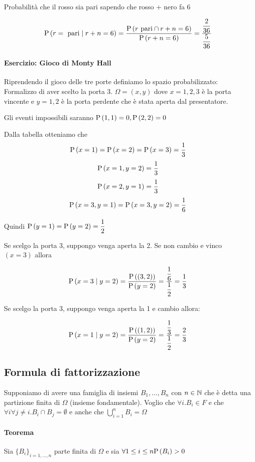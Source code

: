 Probabilità che il rosso sia pari sapendo che rosso + nero fa 6

\[ \text{P}\left(r = \text{ pari}  \mid  r+n = 6\right) = \dfrac{\text{P}\left(r \text{ pari} \cap r+n = 6\right)}{\text{P}\left(r+n = 6\right)} = \dfrac{\dfrac{2}{36}}{\dfrac{5}{36}} \]

\paragraph{Esercizio: Gioco di Monty Hall}
Riprendendo il gioco delle tre porte definiamo lo spazio probabilizzato: Formalizzo di aver scelto la porta 3. $ \Omega = (x,y) $ dove $ x = 1,2,3 $ è la porta vincente e $ y = 1,2 $ è la porta perdente che è stata aperta dal presentatore.

Gli eventi impossibili saranno $ \text{P}\left(1,1\right) = 0, \text{P}\left(2,2\right) = 0 $


Dalla tabella otteniamo che
\[ \text{P}\left(x=1\right) = \text{P}\left(x=2\right) = \text{P}\left(x=3\right) = \dfrac{1}{3} \]
\[ \text{P}\left(x=1,y=2\right) = \dfrac{1}{3} \]
\[ \text{P}\left(x=2,y=1\right) = \dfrac{1}{3} \]
\[ \text{P}\left(x=3,y=1\right) = \text{P}\left(x=3,y=2\right) = \dfrac{1}{6} \]

Quindi $ \text{P}\left(y=1\right) = \text{P}\left(y=2\right) = \dfrac{1}{2} $

Se scelgo la porta 3, suppongo venga aperta la 2. Se non cambio e vinco $ (x = 3) $ allora

\[ \text{P}\left(x=3  \mid  y=2\right) = \dfrac{\text{P}\left((3,2)\right)}{\text{P}\left(y=2\right)} = \dfrac{\dfrac{1}{6}}{\dfrac{1}{2}} = \dfrac{1}{3} \]

Se scelgo la porta 3, suppongo venga aperta la 1 e cambio allora:

\[ \text{P}\left(x=1  \mid  y=2\right) = \dfrac{\text{P}\left((1,2)\right)}{\text{P}\left(y=2\right)} = \dfrac{\dfrac{1}{3}}{\dfrac{1}{2}} = \dfrac{2}{3} \]

\subsection{Formula di fattorizzazione}
Supponiamo di avere una famiglia di insiemi $ B_1, \dots, B_n $ con $ n \in \mathbb{N} $ che è detta una partizione finita di $ \Omega $ (insieme fondamentale). Voglio che $ \forall i . B_i \in F $ e che $ \forall i \forall j\neq i . B_i \cap B_j = \emptyset $ e anche che $ \bigcup_{i=1}^{n} B_i = \Omega $

\paragraph{Teorema}

Sia $ \{B_i\}_{i=1, \dots, n} $ parte finita di $ \Omega $ e sia $ \forall 1 \leq i \leq n \text{P}\left(B_i\right) > 0 $

